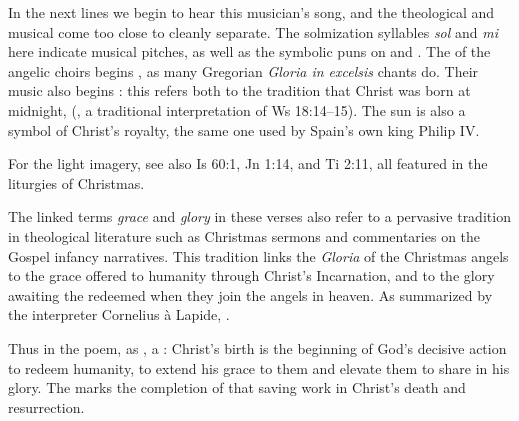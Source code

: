 In the next lines we begin to hear this musician's song, and the theological and
musical come too close to cleanly separate.
The solmization syllables \emph{sol} and \emph{mi} here indicate musical
pitches, as well as the symbolic puns on  and .
The  of the angelic choirs begins , as many
Gregorian \emph{Gloria in excelsis} chants do. 
Their music also begins : this refers both to the tradition
that Christ was born at midnight, 
(, a traditional interpretation of Ws 18:14--15).%
    \Autocite
    [37: .]
    {LuisdeGranada:Xmas}
The sun is also a symbol of Christ's royalty, the same one used by Spain's own
king Philip IV.%
\begin{Footnote}
    For the light imagery, see also Is 60:1, Jn 1:14, and Ti 2:11, all featured
    in the liturgies of Christmas.
\end{Footnote}

The linked terms \emph{grace} and \emph{glory} in these verses also refer to
a pervasive tradition in theological literature such as Christmas sermons and
commentaries on the Gospel infancy narratives.
This tradition links the \emph{Gloria} of the Christmas angels to the grace
offered to humanity through Christ's Incarnation, and to the glory awaiting the
redeemed when they join the angels in heaven.
As summarized by the interpreter Cornelius à Lapide, .%
    \Autocites
    [878, on Jn 1:4:
    .]
    {Lapide:Gospels19C}
    [Cf.] [98, Sermo 185, In Natali Domini 2, in connection with Rom 5:1--2]
    {Augustine:SermonesPL}

Thus in the poem, as , a : Christ's
birth is the beginning of God's decisive action to redeem humanity, to extend
his grace to them and elevate them to share in his glory.
The  marks the completion of that saving work in Christ's
death and resurrection.


